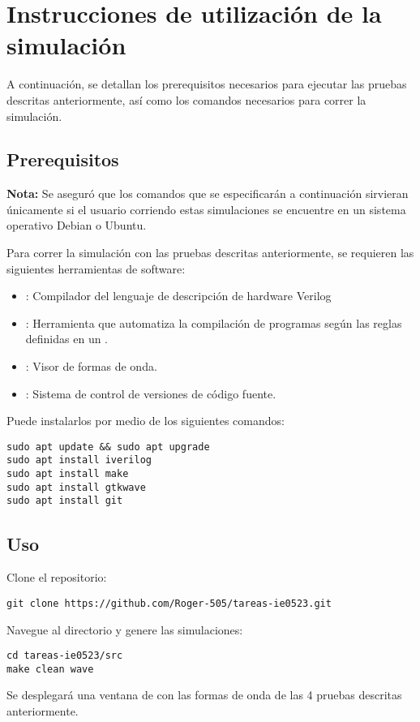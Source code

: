 \newpage

\section{Instrucciones de utilización de la simulación}
A continuación, se detallan los prerequisitos necesarios para ejecutar las pruebas descritas anteriormente, así como los comandos necesarios para correr la simulación. 

\subsection{Prerequisitos}
\textbf{Nota:} Se aseguró que los comandos que se especificarán a continuación sirvieran únicamente si el usuario corriendo estas simulaciones se encuentre en un sistema operativo Debian o Ubuntu.

Para correr la simulación con las pruebas descritas anteriormente, se requieren las siguientes herramientas de software:
\begin{itemize}
    \item {}: Compilador del lenguaje de descripción de hardware Verilog
    \item {}: Herramienta que automatiza la compilación de programas según las reglas definidas en un .
    \item {}: Visor de formas de onda.
    \item {}: Sistema de control de versiones de código fuente.
\end{itemize}

Puede instalarlos por medio de los siguientes comandos:

\begin{verbatim}
sudo apt update && sudo apt upgrade
sudo apt install iverilog
sudo apt install make
sudo apt install gtkwave
sudo apt install git
\end{verbatim}

\subsection{Uso}
Clone el repositorio:
\begin{verbatim}
git clone https://github.com/Roger-505/tareas-ie0523.git
\end{verbatim}
Navegue al directorio  y genere las simulaciones:
\begin{verbatim}
cd tareas-ie0523/src    
make clean wave
\end{verbatim}
Se desplegará una ventana de  con las formas de onda de las 4 pruebas descritas anteriormente.

\newpage

